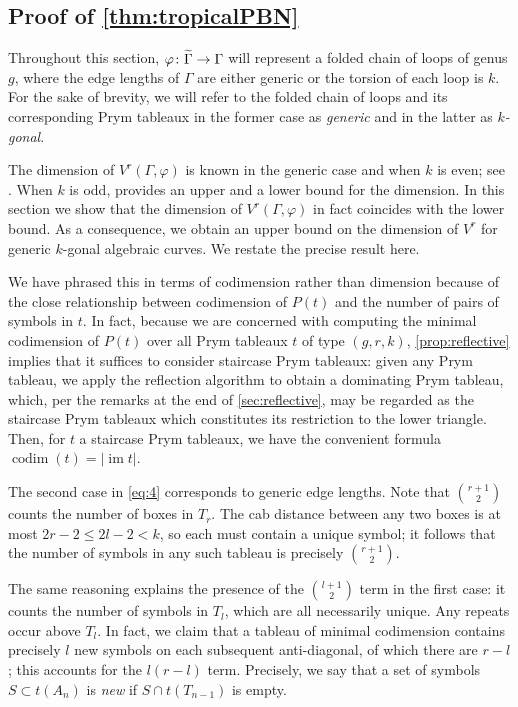 \documentclass[11pt,reqno]{amsart}
\newcommand*{\abs}[1]{{\lvert #1 \rvert}}
\newcommand*{\maps}{\nobreak\mskip2mu\mathpunct{}\nonscript
  \mkern-\thinmuskip{:}\mskip6muplus1mu\relax}
\newcommand*{\card}[1]{\abs{#1}}
\newcommand*{\wti}[1]{\widetilde{#1}}
\newcommand*{\restrict}[1]{{\mid}_{#1}}
\DeclareMathOperator{\im}{im}
\DeclareMathOperator{\codim}{codim}
\theoremstyle{definition}
\theoremstyle{problem}
\theoremstyle{plain}
\theoremstyle{remark}
\theoremstyle{theorem}
\numberwithin{equation}{section}
\numberwithin{figure}{section}
\theoremstyle{definition}
\theoremstyle{problem}
\theoremstyle{plain}
\begin{document}
\subsection{Proof of
  \cref{thm:tropicalPBN}}\label{sec:tropical-dim-proof}

Throughout this section, $\varphi\maps\wti\Gamma\to\Gamma$ will
represent a folded chain of loops of genus $g$, where the edge lengths
of $\Gamma$ are either generic or the torsion of each loop is $k$. For
the sake of brevity, we will refer to the folded chain of loops and
its corresponding Prym tableaux in the former case as \emph{generic}
and in the latter as \textit{$k$-gonal}.

The dimension of $V^r(\Gamma,\varphi)$ is known in the generic case
and when $k$ is even; see \cite[Theorem~6.1.4, Corollary~6.2.2]{len2019skeletons}.  When
$k$ is odd, \cite[Remark~6.2.3]{len2019skeletons} provides an upper
and a lower bound for the dimension. In this section we show that the
dimension of $V^r(\Gamma, \varphi)$ in fact coincides with the lower
bound. As a consequence, we obtain an upper bound on the dimension of
$V^r$ for generic $k$-gonal algebraic curves.  We restate the precise
result here.

\tropicalPBN*

We have phrased this in terms of codimension rather than dimension
because of the close relationship between codimension of $P(t)$ and
the number of pairs of symbols in $t$.  In fact, because we are
concerned with computing the minimal codimension of $P(t)$ over all
Prym tableaux $t$ of type $(g,r,k)$, \cref{prop:reflective} implies
that it suffices to consider staircase Prym tableaux: given any Prym
tableau, we apply the reflection algorithm to obtain a dominating Prym
tableau, which, per the remarks at the end of \cref{sec:reflective},
may be regarded as the staircase Prym tableaux which constitutes its
restriction to the lower triangle.  Then, for $t$ a staircase Prym
tableaux, we have the convenient formula $\codim(t) = \card{\im t}$.

The second case in \cref{eq:4} corresponds to generic edge lengths.
Note that $\binom{r+1}{2}$ counts the number of boxes in $T_r$.  The
cab distance between any two boxes is at most $2r-2 \leq 2l - 2 < k$,
so each must contain a unique symbol; it follows that the number of
symbols in any such tableau is precisely $\binom{r+1}{2}$.

The same reasoning explains the presence of the $\binom{l+1}{2}$ term
in the first case: it counts the number of symbols in $T_l$, which are
all necessarily unique.  Any repeats occur above $T_l$.  In fact, we
claim that a tableau of minimal codimension contains precisely $l$ new
symbols on each subsequent anti-diagonal, of which there are $r-l$;
this accounts for the $l(r-l)$ term.  Precisely, we say that a set of
symbols $S \subset t(A_n)$ is \textit{new} if $S \cap t(T_{n-1})$ is
empty.
\end{document}
